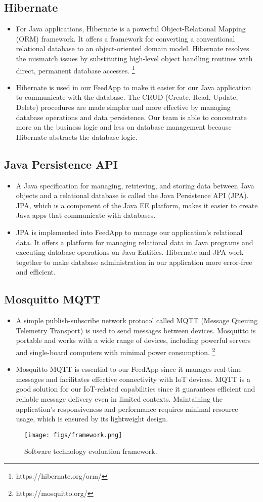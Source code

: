 \subsection{Hibernate}
\begin{itemize}
 \item For Java applications, Hibernate is a powerful Object-Relational Mapping (ORM) framework. It offers a framework for converting a conventional relational database to an object-oriented domain model. Hibernate resolves the mismatch issues by substituting high-level object handling routines with direct, permanent database accesses. \footnote{https://hibernate.org/orm/}
 \item Hibernate is used in our FeedApp to make it easier for our Java application to communicate with the database. The CRUD (Create, Read, Update, Delete) procedures are made simpler and more effective by managing database operations and data persistence. Our team is able to concentrate more on the business logic and less on database management because Hibernate abstracts the database logic.
\end{itemize}

\subsection{Java Persistence API}
\begin{itemize}
 \item A Java specification for managing, retrieving, and storing data between Java objects and a relational database is called the Java Persistence API (JPA). JPA, which is a component of the Java EE platform, makes it easier to create Java apps that communicate with databases.
 \item JPA is implemented into FeedApp to manage our application's relational data. It offers a platform for managing relational data in Java programs and executing database operations on Java Entities. Hibernate and JPA work together to make database administration in our application more error-free and efficient.
\end{itemize}

\subsection{Mosquitto MQTT}
\begin{itemize}
 \item A simple publish-subscribe network protocol called MQTT (Message Queuing Telemetry Transport) is used to send messages between devices. Mosquitto is portable and works with a wide range of devices, including powerful servers and single-board computers with minimal power consumption. \footnote{https://mosquitto.org/}
 \item Mosquitto MQTT is essential to our FeedApp since it manages real-time messages and facilitates effective connectivity with IoT devices. MQTT is a good solution for our IoT-related capabilities since it guarantees efficient and reliable message delivery even in limited contexts. Maintaining the application's responsiveness and performance requires minimal resource usage, which is ensured by its lightweight design.
\end{itemize}

\begin{figure}
  \centering
  \texttt{[image: figs/framework.png]}
  \caption{Software technology evaluation framework.}
  \label{fig:framework}
\end{figure}
